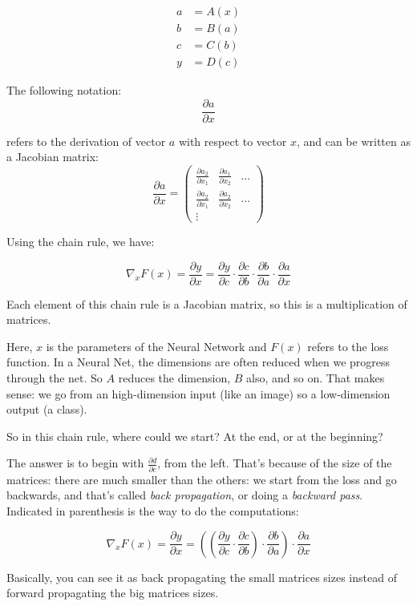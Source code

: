 \documentclass{article}
\theoremstyle{problemstyle}
\begin{document}
\begin{align*}
  a &= A(x) \\
  b &= B(a) \\
  c &= C(b) \\
  y &= D(c)
\end{align*}


The following notation:
\[
  \frac{\partial a}{\partial x}
\]

refers to the derivation of vector $a$ with respect to vector $x$, and can be written as a Jacobian matrix:
\[
  \frac{\partial a}{\partial x} = 
  \begin{pmatrix}
    \frac{\partial a_2}{\partial x_1} & \frac{\partial a_1}{\partial x_2} & \dots \\
    \frac{\partial a_2}{\partial x_1} & \frac{\partial a_2}{\partial x_2} & \dots \\
    \vdots
  \end{pmatrix}
\]

Using the chain rule, we have:

\[
  \nabla_x F(x) = \frac{\partial y}{\partial x} = \frac{\partial y}{\partial c} \cdot \frac{\partial c}{\partial b} \cdot \frac{\partial b}{\partial a} \cdot \frac{\partial a}{\partial x}
\]

Each element of this chain rule is a Jacobian matrix, so this is a multiplication of matrices. 

Here, $x$ is the parameters of the Neural Network and $F(x)$ refers to the loss function. In a Neural Net, the dimensions are often reduced when we progress through the net. So $A$ reduces the dimension, $B$ also, and so on. That makes sense: we go from an high-dimension input (like an image) so a low-dimension output (a class). 


So in this chain rule, where could we start? At the end, or at the beginning? 

The answer is to begin with $ \frac{\partial d}{\partial c} $, from the left. That's because of the size of the matrices: there are much smaller than the others: we start from the loss and go backwards, and that's called \emph{back propagation}, or doing a \emph{backward pass}. Indicated in parenthesis is the way to do the computations:

\[
  \nabla_x F(x) = \frac{\partial y}{\partial x} = \left( \left(  \frac{\partial y}{\partial c} \cdot \frac{\partial c}{\partial b} \right)  \cdot \frac{\partial b}{\partial a} \right) \cdot \frac{\partial a}{\partial x}
\]

Basically, you can see it as back propagating the small matrices sizes instead of forward propagating the big matrices sizes. 
\end{document}
